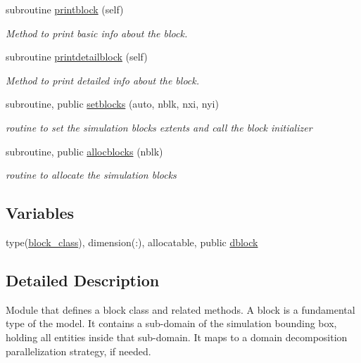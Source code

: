 \begin{DoxyCompactItemize}
subroutine \mbox{\hyperlink{namespaceblocks__mod_a6eab8b323cb15dcecb5c6b0c31b4e246}{printblock}} (self)
\begin{DoxyCompactList}\small\item\em Method to print basic info about the block. \end{DoxyCompactList}\item 
subroutine \mbox{\hyperlink{namespaceblocks__mod_a10f356706988c45a255922fe70851488}{printdetailblock}} (self)
\begin{DoxyCompactList}\small\item\em Method to print detailed info about the block. \end{DoxyCompactList}\item 
subroutine, public \mbox{\hyperlink{namespaceblocks__mod_a8f5a5d9e6cfd16cfd1b179092a204696}{setblocks}} (auto, nblk, nxi, nyi)
\begin{DoxyCompactList}\small\item\em routine to set the simulation blocks extents and call the block initializer \end{DoxyCompactList}\item 
subroutine, public \mbox{\hyperlink{namespaceblocks__mod_a639beb0fee2290d46353f4b4702d6711}{allocblocks}} (nblk)
\begin{DoxyCompactList}\small\item\em routine to allocate the simulation blocks \end{DoxyCompactList}\end{DoxyCompactItemize}
\subsection*{Variables}
\begin{DoxyCompactItemize}
\item 
type(\mbox{\hyperlink{structblocks__mod_1_1block__class}{block\+\_\+class}}), dimension(\+:), allocatable, public \mbox{\hyperlink{namespaceblocks__mod_ac8ad6e3cf7a812f95dadb592336aca50}{dblock}}
\end{DoxyCompactItemize}


\subsection{Detailed Description}
Module that defines a block class and related methods. A block is a fundamental type of the model. It contains a sub-\/domain of the simulation bounding box, holding all entities inside that sub-\/domain. It maps to a domain decomposition parallelization strategy, if needed. 

